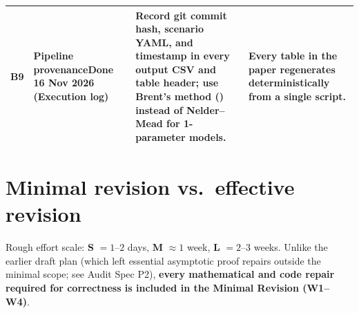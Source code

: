 \documentclass[11pt]{article}
\newcommand{\code}[1]{\texttt{\detokenize{#1}}}
\begin{document}
{\begin{longtable}{@{}L{0.7cm}L{4.2cm}L{5.5cm}L{4.9cm}@{}}
B9 & Pipeline provenance\newline\textbf{Done 16 Nov 2026} (Execution log) & Record git commit hash, scenario YAML, and timestamp in every output CSV and table header; use Brent's method (\code{optimize}) instead of Nelder--Mead for 1-parameter models. & Every table in the paper regenerates deterministically from a single script.\\
\bottomrule
\end{longtable}
}

\section{Minimal revision vs.\ effective revision}
\label{sec:scopes}

Rough effort scale: \textbf{S} $= 1$--$2$ days, \textbf{M} $\approx 1$ week, \textbf{L} $= 2$--$3$ weeks. Unlike the earlier draft plan (which left essential asymptotic proof repairs outside the minimal scope; see Audit Spec P2), \textbf{every mathematical and code repair required for correctness is included in the Minimal Revision (W1--W4)}.
\end{document}
